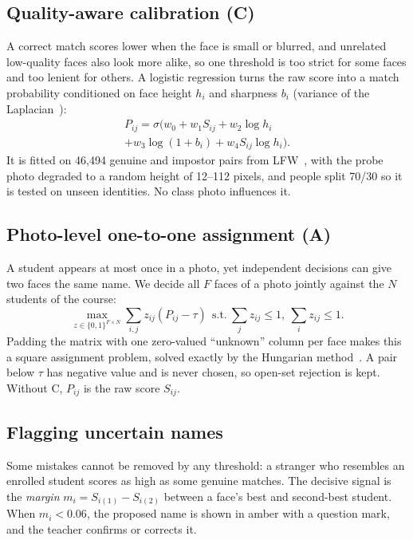 \documentclass[conference,a4paper]{IEEEtran}
\begin{document}
\subsection{Quality-aware calibration (C)}
A correct match scores lower when the face is small or blurred, and unrelated low-quality faces also look more alike, so one threshold is too strict for some faces and too lenient for others. A logistic regression turns the raw score into a match probability conditioned on face height $h_i$ and sharpness $b_i$ (variance of the Laplacian~\cite{laplacian}):
\begin{multline}
P_{ij} = \sigma\big(w_0 + w_1 S_{ij} + w_2 \log h_i \\
+ w_3 \log(1{+}b_i) + w_4 S_{ij}\log h_i\big).
\end{multline}
It is fitted on 46,494 genuine and impostor pairs from LFW~\cite{lfw}, with the probe photo degraded to a random height of 12--112 pixels, and people split 70/30 so it is tested on unseen identities. No class photo influences it.

\subsection{Photo-level one-to-one assignment (A)}
A student appears at most once in a photo, yet independent decisions can give two faces the same name. We decide all $F$ faces of a photo jointly against the $N$ students of the course:
\begin{equation}
\max_{z\in\{0,1\}^{F\times N}} \sum_{i,j} z_{ij}(P_{ij}-\tau)\ \ \text{s.t.}\ \sum_j z_{ij}\le1,\ \sum_i z_{ij}\le1 .
\end{equation}
Padding the matrix with one zero-valued ``unknown'' column per face makes this a square assignment problem, solved exactly by the Hungarian method~\cite{kuhn}. A pair below $\tau$ has negative value and is never chosen, so open-set rejection is kept. Without C, $P_{ij}$ is the raw score $S_{ij}$.

\subsection{Flagging uncertain names}
Some mistakes cannot be removed by any threshold: a stranger who resembles an enrolled student scores as high as some genuine matches. The decisive signal is the \emph{margin} $m_i = S_{i(1)} - S_{i(2)}$ between a face's best and second-best student. When $m_i < 0.06$, the proposed name is shown in amber with a question mark, and the teacher confirms or corrects it.
\end{document}
